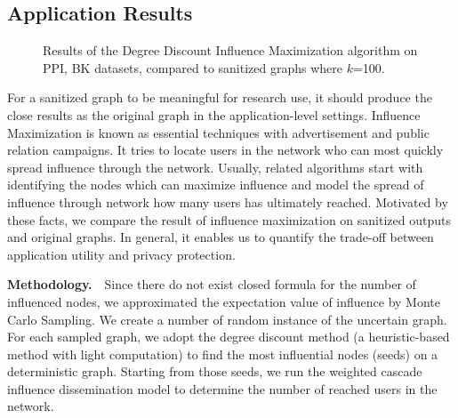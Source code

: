 \subsection{Application Results}
\begin{figure}[!htb]
    \centering
    \caption{Results of the Degree Discount Influence Maximization algorithm on PPI, BK datasets, 
    compared to sanitized graphs where $k$=100.}
    \vspace{-10pt}
    \label{fig:IM}
\end{figure} 
For a sanitized graph to be meaningful for research use, it should produce 
the close results as the original graph in the application-level settings. 
Influence Maximization is known as essential techniques with advertisement and public relation campaigns.
It tries to locate users in the network who can most quickly spread influence through the network. 
Usually, related algorithms start with identifying the nodes which can maximize influence and model the spread of influence through network how many users has ultimately reached.  
Motivated by these facts, we compare the result of influence maximization on sanitized outputs and original graphs. 
In general, it enables us to quantify the trade-off between application utility and privacy protection. 

\textbf{Methodology.}~~Since there do not exist closed formula for the number of influenced nodes, we approximated the expectation value of influence by Monte Carlo Sampling. We create a number of random instance of the uncertain graph. For each sampled graph, we adopt the degree discount method (a heuristic-based method with light computation) to find the most influential nodes (seeds) on a deterministic graph. Starting from those seeds, we run the weighted cascade influence dissemination model to determine the number of reached users in the network. 

